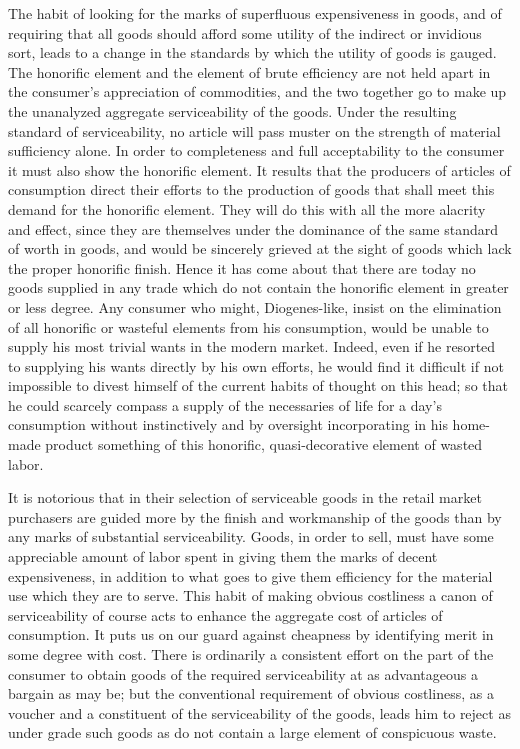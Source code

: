 \documentclass[12pt]{report}
\begin{document}
The habit of looking for the marks of superfluous expensiveness in
goods, and of requiring that all goods should afford some utility of the
indirect or invidious sort, leads to a change in the standards by which
the utility of goods is gauged. The honorific element and the element
of brute efficiency are not held apart in the consumer's appreciation of
commodities, and the two together go to make up the unanalyzed
aggregate serviceability of the goods. Under the resulting standard of
serviceability, no article will pass muster on the strength of material
sufficiency alone. In order to completeness and full acceptability to
the consumer it must also show the honorific element. It results that
the producers of articles of consumption direct their efforts to the
production of goods that shall meet this demand for the honorific
element. They will do this with all the more alacrity and effect, since
they are themselves under the dominance of the same standard of worth in
goods, and would be sincerely grieved at the sight of goods which lack
the proper honorific finish. Hence it has come about that there are
today no goods supplied in any trade which do not contain the
honorific element in greater or less degree. Any consumer who might,
Diogenes-like, insist on the elimination of all honorific or wasteful
elements from his consumption, would be unable to supply his most
trivial wants in the modern market. Indeed, even if he resorted to
supplying his wants directly by his own efforts, he would find it
difficult if not impossible to divest himself of the current habits of
thought on this head; so that he could scarcely compass a supply of the
necessaries of life for a day's consumption without instinctively and
by oversight incorporating in his home-made product something of this
honorific, quasi-decorative element of wasted labor.

It is notorious that in their selection of serviceable goods in the
retail market purchasers are guided more by the finish and workmanship
of the goods than by any marks of substantial serviceability. Goods,
in order to sell, must have some appreciable amount of labor spent in
giving them the marks of decent expensiveness, in addition to what goes
to give them efficiency for the material use which they are to serve.
This habit of making obvious costliness a canon of serviceability of
course acts to enhance the aggregate cost of articles of consumption.
It puts us on our guard against cheapness by identifying merit in some
degree with cost. There is ordinarily a consistent effort on the part
of the consumer to obtain goods of the required serviceability at as
advantageous a bargain as may be; but the conventional requirement of
obvious costliness, as a voucher and a constituent of the serviceability
of the goods, leads him to reject as under grade such goods as do not
contain a large element of conspicuous waste.
\end{document}

